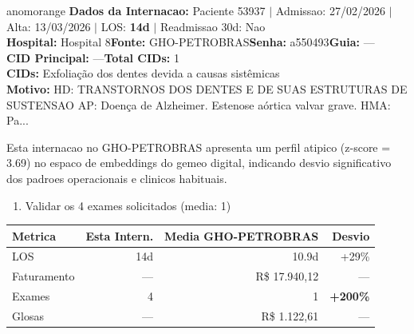 \documentclass[a4paper,10pt]{article}
\begin{document}
\begin{anomalycard}[Internacao 167286 | GHO-PETROBRAS | ALTO (z=3.69)]{anomorange}
\textbf{Dados da Internacao:} Paciente 53937 $\mid$ Admissao: 27/02/2026 $\mid$ Alta: 13/03/2026 $\mid$ LOS: \textbf{14d} $\mid$ Readmissao 30d: Nao\\
\textbf{Hospital:} Hospital 8\quad\textbf{Fonte:} GHO-PETROBRAS\quad\textbf{Senha:} a550493\quad\textbf{Guia:} ---\\
\textbf{CID Principal:} {\small ---}\quad\textbf{Total CIDs:} 1\\

\textbf{CIDs:} {\scriptsize Exfoliação dos dentes devida a causas sistêmicas}\\

\textbf{Motivo:} {\scriptsize HD: TRANSTORNOS DOS DENTES E DE SUAS ESTRUTURAS DE SUSTENSAO  AP: Doença de Alzheimer. Estenose aórtica valvar grave.  HMA: Pa...}\\

\vspace{2pt}\begin{tcolorbox}[colback=severityred!20,colframe=anomorange,title={\textbf{Interpretacao de Negocio}},fonttitle=\bfseries\small,left=4pt,right=4pt,top=3pt,bottom=3pt]
{\small Esta internacao no GHO-PETROBRAS apresenta um perfil atipico (z-score = 3.69) no espaco de embeddings do gemeo digital, indicando desvio significativo dos padroes operacionais e clinicos habituais.}
\end{tcolorbox}
\begin{tcolorbox}[colback=severityyellow!30,colframe=anomorange,title={\textbf{Recomendacoes Especificas}},fonttitle=\bfseries\small,left=4pt,right=4pt,top=3pt,bottom=3pt]
\begin{enumerate}[nosep,leftmargin=16pt]
\item {\small Validar os 4 exames solicitados (media: 1)}
\end{enumerate}
\end{tcolorbox}
\begin{center}\begin{tabular}{l r r r}\toprule\textbf{Metrica} & \textbf{Esta Intern.} & \textbf{Media GHO-PETROBRAS} & \textbf{Desvio} \\\midrule
LOS & 14d & 10.9d & +29\% \\
Faturamento & --- & R\$ 17.940,12 & --- \\
Exames & 4 & 1 & \textcolor{anomred}{\textbf{+200\%}} \\
Glosas & --- & R\$ 1.122,61 & --- \\
\bottomrule\end{tabular}\end{center}


\end{anomalycard}
\end{document}
